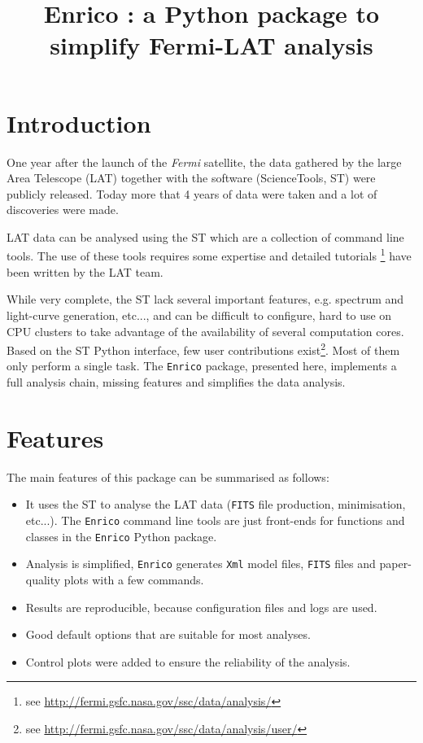 \documentclass[a4paper]{article}
\title{Enrico : a Python package to simplify Fermi-LAT analysis}
\newcommand{\Fermi}{\textit{Fermi} }
\begin{document}
\maketitle
\section{Introduction}

One year after the launch of the \Fermi satellite, the data gathered by the
large Area Telescope (LAT) together with the software (ScienceTools, ST) were
publicly released. Today more that 4 years of data were taken and a lot of
discoveries were made.

LAT data can be analysed using the ST which are a collection of command line
tools. The use of these tools requires some expertise and detailed tutorials
\footnote{see \url{http://fermi.gsfc.nasa.gov/ssc/data/analysis/}} have been
written by the LAT team.

While very complete, the ST lack several important features, e.g. spectrum and
light-curve generation, etc..., and can be difficult to configure, hard to use
on CPU clusters to take advantage of the availability of several computation
cores. Based on the ST Python interface, few user contributions
exist\footnote{see \url{http://fermi.gsfc.nasa.gov/ssc/data/analysis/user/}}.
Most of them only perform a single task. The {\tt Enrico} package, presented
here, implements a full analysis chain, missing features and simplifies the data
analysis.


\section{Features}




The main features of this package can be summarised as follows:

\begin{itemize}
\item It uses the ST to analyse the LAT data ({\tt FITS} file production,
minimisation, etc...). The {\tt Enrico} command line tools are just front-ends
for functions and classes in the {\tt Enrico} Python package.
\item Analysis is simplified, {\tt Enrico} generates {\tt Xml} model files, {\tt FITS} files and paper-quality plots with a few commands.
\item Results are reproducible, because configuration files and logs are used.
\item Good default options that are suitable for most analyses.
\item Control plots were added to ensure the reliability of the analysis.
\end{itemize}
\end{document}
